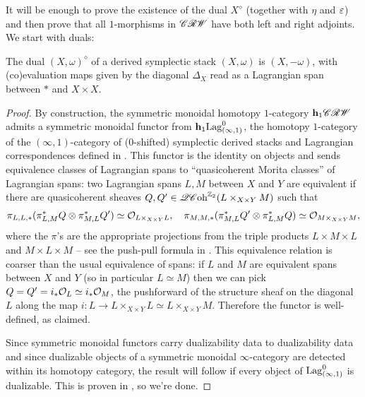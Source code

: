 It will be enough to prove the existence of the dual $X^\diamond$ (together with $\eta$ and $\varepsilon$) and then prove that all $1$-morphisms in $\mathscr{CRW}$ have both left and right adjoints. We start with duals:

\begin{prp} \label{prp:duals}
	The dual $(X, \omega)^\diamond$ of a derived symplectic stack $(X, \omega)$ is $(X, -\omega)$, with (co)evaluation maps given by the diagonal $\Delta_X$ read as a Lagrangian span between $\ast$ and $X \times X$.
\end{prp}

\begin{proof}
	By construction, the symmetric monoidal homotopy $1$-category $\mathbf{h}_1 \mathscr{CRW}$ admits a symmetric monoidal functor from $\mathbf{h}_1 \mathrm{Lag}_{(\infty,1)}^0$, the homotopy $1$-category of the $(\infty,1)$-category of ($0$-shifted) symplectic derived stacks and Lagrangian correspondences defined in \cite[Section 14]{Haugseng2018}. This functor is the identity on objects and sends equivalence classes of Lagrangian spans to ``quasicoherent Morita classes'' of Lagrangian spans: two Lagrangian spans $L, M$ between $X$ and $Y$ are equivalent if there are quasicoherent sheaves $Q, Q' \in \mathscr{QC}\mathrm{oh}^{\mathbb{Z}_2}(L \times_{X \times Y} M)$ such that
	\begin{equation*}
		\pi_{L,L, \ast} (\pi_{L,M}^\ast Q \otimes \pi_{M,L}^\ast Q') \simeq \mathcal{O}_{L \times_{X \times Y} L}, \quad \pi_{M,M, \ast} (\pi_{M,L}^\ast Q' \otimes \pi_{L,M}^\ast Q) \simeq \mathcal{O}_{M \times_{X \times Y} M},
	\end{equation*}
	where the $\pi$'s are the appropriate projections from the triple products $L \times M \times L$ and $M \times L \times M$ -- see the push-pull formula in \cite{Riva2024}. This equivalence relation is coarser than the usual equivalence of spans: if $L$ and $ M$ are equivalent spans between $X$ and $Y$ (so in particular $L \simeq M$) then we can pick $Q = Q' = i_\ast \mathcal{O}_{L} \simeq i_\ast \mathcal{O}_{M}$, the pushforward of the structure sheaf on the diagonal $L$ along the map $i : L \to L \times_{X \times Y} L \simeq L \times_{X \times Y} M$. Therefore the functor is well-defined, as claimed.
	
	Since symmetric monoidal functors carry dualizability data to dualizability data and since dualizable objects of a symmetric monoidal $\infty$-category are detected within its homotopy category, the result will follow if every object of $\mathrm{Lag}_{(\infty,1)}^0$ is dualizable. This is proven in \cite[Proposition 14.16]{Haugseng2018}, so we're done.
\end{proof}

